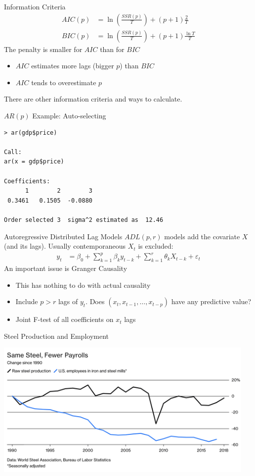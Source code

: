 \documentclass[aspectratio=169]{beamer}
\begin{document}
\begin{frame}{Information Criteria}
\begin{align*}
AIC(p) &= \ln \left(\frac{SSR(p)}{T} \right) + (p+1) \frac{2}{T}\\
BIC(p) &= \ln \left(\frac{SSR(p)}{T} \right) + (p+1) \frac{\ln T}{T}
\end{align*}
The penalty is smaller for $AIC$ than for $BIC$
\begin{itemize}
  \item $AIC$ estimates more lags (bigger $p$) than $BIC$
  \item $AIC$ tends to overestimate $p$
\end{itemize}
There are other information criteria and ways to calculate.
\end{frame}

\begin{frame}[fragile]{$AR(p)$ Example: Auto-selecting}
\begin{verbatim}
> ar(gdp$price)

Call:
ar(x = gdp$price)

Coefficients:
      1        2        3  
 0.3461   0.1505  -0.0880  

Order selected 3  sigma^2 estimated as  12.46
\end{verbatim}
\end{frame}

\begin{frame}{Autoregressive Distributed Lag Models}
$ADL(p,r)$ models add the covariate $X$ (and its lags). Usually contemporaneous $X_t$ is excluded:
\begin{align*}
y_t &= \beta_0 + \sum_{k=1}^p \beta_k y_{t-k} + \sum_{k=1}^r \theta_k X_{t-k} + \varepsilon_t
\end{align*}
An important issue is \alert{Granger Causality}
\begin{itemize}
\item This has \alert{nothing to do} with actual causality
\item Include $p>r$ lags of $y_t$. Does $(x_t,x_{t-1},\ldots,x_{t-p})$ have any predictive value?
\item Joint F-test of all coefficients on $x_t$ lags
\end{itemize}
\end{frame}

\begin{frame}{Steel Production and Employment}
\begin{center}
\includegraphics[width=5in]{./resources/steel.png}
\end{center}
\end{frame}
\end{document}
